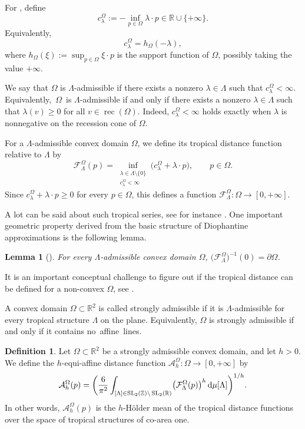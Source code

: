\documentclass[10pt,a4paper]{amsart}
\numberwithin{equation}{section}
\newtheorem{Lemma}[Theorem]{Lemma}
\theoremstyle{definition}
\newtheorem{Definition}[Theorem]{Definition}
\begin{document}
For , define
\[
c^\Omega_\lambda:=-\inf_{p\in \Omega}\lambda\cdot p \in \mathbb R\cup\{+\infty\}.
\]
Equivalently,
\[
c^\Omega_\lambda=h_\Omega(-\lambda),
\]
where $h_\Omega(\xi):=\sup_{p\in\Omega}\xi\cdot p$ is the support function of $\Omega$, possibly taking the value $+\infty$.

We say that $\Omega$ is $\Lambda$-admissible if there exists a nonzero $\lambda\in\Lambda$ such that $c^\Omega_\lambda<\infty$. Equivalently,~$\Omega$~is $\Lambda$-admissible if and only if there exists a nonzero $\lambda\in\Lambda$ such that
$\lambda(v)\ge 0$  for all $v\in \operatorname{rec}(\Omega)$.
Indeed, $c^\Omega_\lambda<\infty$ holds exactly when $\lambda$ is nonnegative on the recession cone of $\Omega$.

For a $\Lambda$-admissible convex domain $\Omega$, we define its tropical distance function relative to $\Lambda$ by
\[
\mathcal F^\Omega_\Lambda(p)
=
\inf_{\substack{\lambda\in\Lambda\setminus\{0\}\\ c^\Omega_\lambda<\infty}}
\bigl(c^\Omega_\lambda+\lambda\cdot p\bigr),
\qquad
p\in\Omega.
\]
Since $c^\Omega_\lambda+\lambda\cdot p\ge 0$ for every $p\in\Omega$, this defines a function
$
\mathcal F^\Omega_\Lambda\colon   \Omega\to [0,+\infty]$.

A lot can be said about such tropical series, see for instance \cite{kalinin2021shrinking, us_series, mikhalkin2023wave}. One important geometric property derived from the basic structure of Diophantine approximations is the following lemma.
\begin{Lemma}[{\cite[Lemma 4.4]{us_series}}]
For every $\Lambda$-admissible convex domain $\Omega$,
$\bigl(\mathcal F^\Omega_\Lambda\bigr)^{-1}(0)=\partial\Omega$.
\end{Lemma}
It is an important conceptual challenge to figure out if the tropical distance can be defined for a non-convex $\Omega$, see \cite{Shkolnikov2025PlanarTropicalCaustics}.

A convex domain $\Omega\subset\mathbb{R}^2$ is called strongly admissible if it is $\Lambda$-admissible for every tropical structure $\Lambda$ on the plane. Equivalently, $\Omega$ is strongly admissible if and only if it contains no~affine~lines.

\begin{Definition}
Let $\Omega\subset\mathbb{R}^2$ be a strongly admissible convex domain, and let $h>0$. We define the $h$-equi-affine distance function
$\mathcal{A}_{h}^\Omega\colon  \Omega\to[0,+\infty]$
by
\[
\mathcal{A}_{h}^\Omega(p)=
\biggl(
\frac{6}{\pi^2}
\int_{[\Lambda]\in \operatorname{SL}_2(\mathbb{Z})\backslash\operatorname{SL}_2(\mathbb{R})}
\bigl(\mathcal{F}^\Omega_\Lambda(p)\bigr)^{h}\,{\rm d}\mu[\Lambda]
\biggr)^{1/h}.
\]
In other words, $\mathcal{A}_{h}^\Omega(p)$ is the $h$-H\"older mean of the tropical distance functions over the space of tropical structures of co-area one.
\end{Definition}
\end{document}
